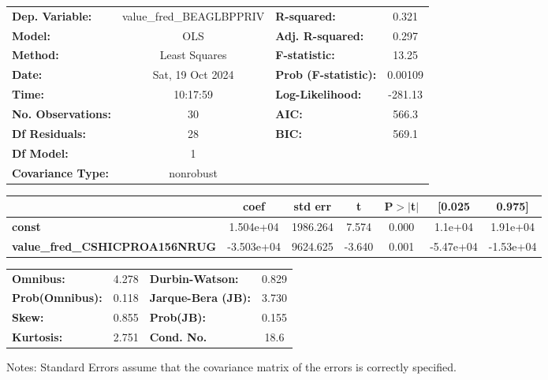 \begin{center}
\begin{tabular}{lclc}
\toprule
\textbf{Dep. Variable:}                & value\_fred\_BEAGLBPPRIV & \textbf{  R-squared:         } &     0.321   \\
\textbf{Model:}                        &           OLS            & \textbf{  Adj. R-squared:    } &     0.297   \\
\textbf{Method:}                       &      Least Squares       & \textbf{  F-statistic:       } &     13.25   \\
\textbf{Date:}                         &     Sat, 19 Oct 2024     & \textbf{  Prob (F-statistic):} &  0.00109    \\
\textbf{Time:}                         &         10:17:59         & \textbf{  Log-Likelihood:    } &   -281.13   \\
\textbf{No. Observations:}             &              30          & \textbf{  AIC:               } &     566.3   \\
\textbf{Df Residuals:}                 &              28          & \textbf{  BIC:               } &     569.1   \\
\textbf{Df Model:}                     &               1          & \textbf{                     } &             \\
\textbf{Covariance Type:}              &        nonrobust         & \textbf{                     } &             \\
\bottomrule
\end{tabular}
\begin{tabular}{lcccccc}
                                       & \textbf{coef} & \textbf{std err} & \textbf{t} & \textbf{P$> |$t$|$} & \textbf{[0.025} & \textbf{0.975]}  \\
\midrule
\textbf{const}                         &    1.504e+04  &     1986.264     &     7.574  &         0.000        &      1.1e+04    &     1.91e+04     \\
\textbf{value\_fred\_CSHICPROA156NRUG} &   -3.503e+04  &     9624.625     &    -3.640  &         0.001        &    -5.47e+04    &    -1.53e+04     \\
\bottomrule
\end{tabular}
\begin{tabular}{lclc}
\textbf{Omnibus:}       &  4.278 & \textbf{  Durbin-Watson:     } &    0.829  \\
\textbf{Prob(Omnibus):} &  0.118 & \textbf{  Jarque-Bera (JB):  } &    3.730  \\
\textbf{Skew:}          &  0.855 & \textbf{  Prob(JB):          } &    0.155  \\
\textbf{Kurtosis:}      &  2.751 & \textbf{  Cond. No.          } &     18.6  \\
\bottomrule
\end{tabular}
\end{center}

Notes: \newline
 [1] Standard Errors assume that the covariance matrix of the errors is correctly specified.